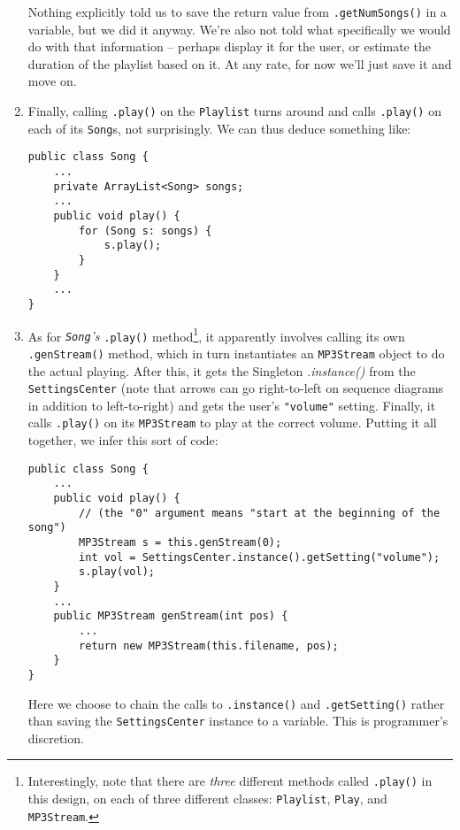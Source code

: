 \begin{enumerate}
Nothing explicitly told us to save the return value from
\texttt{.getNumSongs()} in a variable, but we did it anyway. We're also not
told what specifically we would do with that information -- perhaps display it
for the user, or estimate the duration of the playlist based on it. At any
rate, for now we'll just save it and move on.

\item Finally, calling \texttt{.play()} on the \texttt{Playlist} turns around
and calls \texttt{.play()} on each of its \texttt{Song}s, not surprisingly. We
can thus deduce something like:

\begin{Verbatim}[fontsize=\footnotesize,samepage=true,frame=single]
public class Song {
    ...
    private ArrayList<Song> songs;
    ...
    public void play() {
        for (Song s: songs) {
            s.play();
        }         
    }
    ...
}
\end{Verbatim}

\item As for \textit{\texttt{Song}'s} \texttt{.play()}
method\footnote{Interestingly, note that there are \textit{three} different
methods called \texttt{.play()} in this design, on each of three different
classes: \texttt{Playlist}, \texttt{Play}, and \texttt{MP3Stream}.}, it
apparently involves calling its own \texttt{.genStream()} method, which in
turn instantiates an \texttt{MP3Stream} object to do the actual playing. After
this, it gets the Singleton \textit{.instance()} from the
\texttt{SettingsCenter} (note that arrows can go right-to-left on sequence
diagrams in addition to left-to-right) and gets the user's \texttt{"volume"}
setting. Finally, it calls \texttt{.play()} on its \texttt{MP3Stream} to play
at the correct volume. Putting it all together, we infer this sort of code:

\begin{Verbatim}[fontsize=\scriptsize,samepage=true,frame=single]
public class Song {
    ...
    public void play() {
        // (the "0" argument means "start at the beginning of the song")
        MP3Stream s = this.genStream(0);  
        int vol = SettingsCenter.instance().getSetting("volume");
        s.play(vol);
    }
    ...
    public MP3Stream genStream(int pos) {
        ...
        return new MP3Stream(this.filename, pos);
    }
}
\end{Verbatim}

Here we choose to chain the calls to \texttt{.instance()} and
\texttt{.getSetting()} rather than saving the \texttt{SettingsCenter} instance
to a variable. This is programmer's discretion. 



\end{enumerate}

